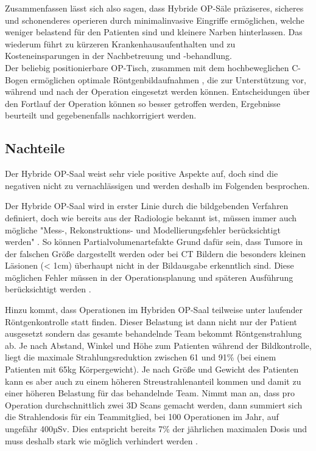 

Zusammenfassen lässt sich also sagen, dass Hybride OP-Säle präziseres, sicheres und schonenderes operieren \cite{DresdnerUniklinikum} durch minimalinvasive Eingriffe ermöglichen, welche weniger belastend für den Patienten sind und kleinere Narben hinterlassen. Das wiederum  führt zu kürzeren Krankenhausaufenthalten und zu Kosteneinsparungen in der Nachbetreuung und -behandlung. \\
Der beliebig positionierbare OP-Tisch, zusammen mit dem hochbeweglichen C-Bogen  ermöglichen optimale Röntgenbildaufnahmen \cite{DresdnerUniklinikum}, die zur Unterstützung vor, während und nach der Operation eingesetzt werden können. Entscheidungen über den Fortlauf der Operation können so besser getroffen werden, Ergebnisse beurteilt und gegebenenfalls nachkorrigiert werden.

\subsection{Nachteile}

Der Hybride OP-Saal weist sehr viele positive Aspekte auf, doch sind die negativen nicht zu vernachlässigen und werden deshalb im Folgenden besprochen.

Der Hybride OP-Saal wird in erster Linie durch die bildgebenden Verfahren definiert, doch wie bereits aus der Radiologie bekannt ist, müssen immer auch mögliche "Mess-, Rekonstruktions- und Modellierungsfehler berücksichtigt werden" \cite{DerDigitaleOperationssaal}. 
So können Partialvolumenartefakte Grund dafür sein, dass Tumore in der falschen Größe dargestellt werden oder bei CT Bildern die besonders kleinen Läsionen (< 1cm) überhaupt nicht in der Bildausgabe erkenntlich sind. Diese möglichen Fehler müssen in der Operationsplanung und späteren Ausführung berücksichtigt werden \cite{DerDigitaleOperationssaal}.

Hinzu kommt, dass Operationen im Hybriden OP-Saal teilweise unter laufender Röntgenkontrolle statt finden. Dieser Belastung ist dann nicht nur der Patient ausgesetzt sondern das gesamte behandelnde Team bekommt Röntgenstrahlung ab. Je nach Abstand, Winkel und Höhe zum Patienten während der Bildkontrolle, liegt die maximale Strahlungsreduktion zwischen 61 und 91\% (bei einem Patienten mit 65kg Körpergewicht). Je nach Größe und Gewicht des Patienten kann es aber auch zu einem höheren Streustrahlenanteil kommen und damit zu einer höheren Belastung für das behandelnde Team.
Nimmt man an, dass pro Operation durchschnittlich zwei 3D Scans gemacht werden, dann summiert sich die Strahlendosis für ein Teammitglied, bei 100 Operationen im Jahr, auf ungefähr 400µSv. Dies entspricht bereits 7\% der jährlichen maximalen Dosis und muss deshalb stark wie möglich verhindert werden \cite{RadiationExposure}.

